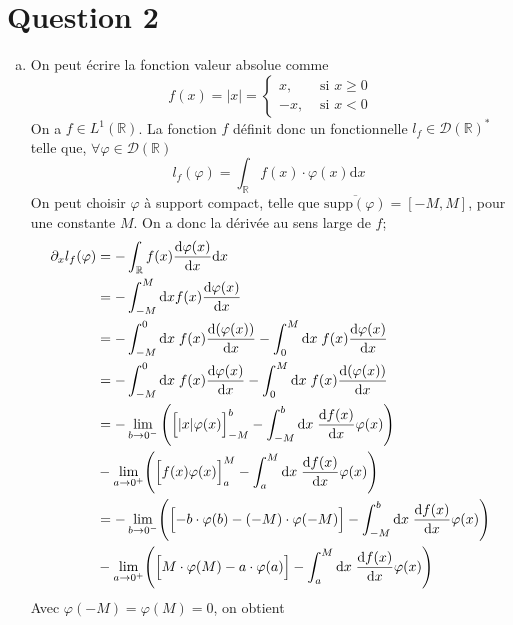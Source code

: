 \documentclass[letterpaper,12pt,oneside,final]{book}
\begin{document}
\newpage
\section*{Question 2}

\begin{enumerate}[a)]

\item %
On peut écrire la fonction valeur absolue comme 
\[ f(x) = \lvert x \rvert  = \begin{cases}
	x, &\text{ si } x \geq  0 \\ 
	-x, &\text{ si } x<0
\end{cases} \]
On a \( f \in L^{1}(\mathbb{R} ) \). La fonction \( f \) définit donc un fonctionnelle \( l_{f}\in \mathcal{D}(\mathbb{R} )^{*} \) telle que, \( \forall \varphi \in \mathcal{D}(\mathbb{R} ) \)
\[ l_{f}(\varphi) = \int_{\mathbb{R} }f(x)\cdot \varphi (x) \text{d}x\; \]
On peut choisir \( \varphi  \) à support compact, telle que \( \overline{\text{supp}(\varphi)} = [-M,M] \), pour une constante \( M \).
On a donc la dérivée au sens large de \( f \); 
\begin{equation*}
\begin{split}
	\partial_{x}l_{f}(\varphi) &= - \int_{\mathbb{R} }f(x) \frac{\text{d}\varphi (x)}{\text{d}x} \text{d}x\;\\ 
& = - \int_{-M}^{M}\text{d}x f(x) \frac{\text{d}\varphi (x)}{\text{d}x}\;\\ 
& = -\int_{-M}^{0}\text{d}x\;f(x)\frac{\text{d}(\varphi(x))}{\text{d}x} - \int_{0}^{M}\text{d}x\;f(x) \frac{\text{d}\varphi (x)}{\text{d}x} \\ 
& = -\int_{-M}^{0}\text{d}x\;f(x)\frac{\text{d}\varphi (x)}{\text{d}x} -\int_{0}^{M}\text{d}x\;f(x)\frac{\text{d}(\varphi (x))}{\text{d}x}\\ 
& = -\lim_{b \to 0^{-}}\Bigg(\Bigl[\lvert x \rvert \varphi (x)\Bigr]_{-M}^{b} - \int_{-M}^{b}\text{d}x\;\frac{\text{d}f(x)}{\text{d}x} \varphi(x)\Bigg)\\
& - \lim_{a \to 0^{+}} \Biggl(\Bigl[f(x)\varphi (x)\Bigr]_{a}^{M}-\int_{a}^{M}\text{d}x\;\frac{\text{d}f(x)}{\text{d}x} \varphi (x)\Biggr)\\
& = -\lim_{b \to 0^{-}} \Biggl(\Bigl[-b\cdot \varphi (b)-(-M)\cdot \varphi(-M)\Bigr]-\int_{-M}^{b}\text{d}x\;\frac{\text{d}f(x)}{\text{d}x}\varphi(x)\Biggr)\\
& -\lim_{a \to 0^{+}}\Biggl(\Bigl[M\cdot \varphi (M)-a\cdot \varphi (a)\Bigr]-\int_{a}^{M}\text{d}x\;\frac{\text{d}f(x)}{\text{d}x} \varphi (x)\Biggr) 
\end{split}
\end{equation*}
Avec \( \varphi(-M)=\varphi(M) =0 \), on obtient 


\end{enumerate}
\end{document}
